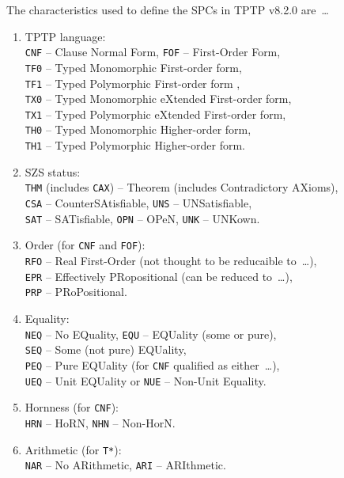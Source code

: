 \documentclass[runningheads]{llncs}
\begin{document}
The characteristics used to define the SPCs in TPTP v8.2.0 are~\ldots
\begin{enumerate}
\item TPTP language: \\
      {\tt CNF} -- Clause Normal Form,
      {\tt FOF} -- First-Order Form, \\
      {\tt TF0} -- Typed Monomorphic First-order form, \\
      {\tt TF1} -- Typed Polymorphic First-order form , \\
      {\tt TX0} -- Typed Monomorphic eXtended First-order form, \\
      {\tt TX1} -- Typed Polymorphic eXtended First-order form, \\
      {\tt TH0} -- Typed Monomorphic Higher-order form, \\
      {\tt TH1} -- Typed Polymorphic Higher-order form.
\item SZS status: \\
      {\tt THM} (includes {\tt CAX}) -- Theorem (includes Contradictory AXioms), \\
      {\tt CSA} -- CounterSAtisfiable,
      {\tt UNS} -- UNSatisfiable, \\
      {\tt SAT} -- SATisfiable,
      {\tt OPN} -- OPeN, 
      {\tt UNK} -- UNKown.
\item Order (for {\tt CNF} and {\tt FOF}): \\
      {\tt RFO} -- Real First-Order (not thought to be reducaible to~\ldots),\\
      {\tt EPR} -- Effectively PRopositional (can be reduced to~\ldots),\\
      {\tt PRP} -- PRoPositional.
\item Equality: \\
      {\tt NEQ} -- No EQuality,
      {\tt EQU} -- EQUality (some or pure), \\
      {\tt SEQ} -- Some (not pure) EQUality, \\
      {\tt PEQ} -- Pure EQUality (for {\tt CNF} qualified as either~\ldots),\\
      {\tt UEQ} -- Unit EQUality or
      {\tt NUE} -- Non-Unit Equality.
\item Hornness (for {\tt CNF}): \\
      {\tt HRN} -- HoRN,
      {\tt NHN} -- Non-HorN.
\item Arithmetic (for {\tt T*}): \\
      {\tt NAR} -- No ARithmetic,
      {\tt ARI} -- ARIthmetic.
\end{enumerate}
\end{document}
